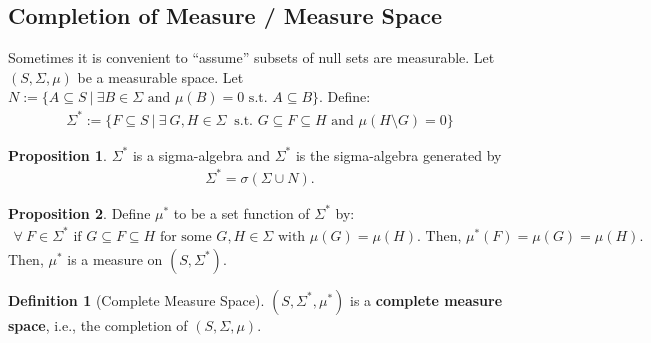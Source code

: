 \documentclass[11pt]{article}
\theoremstyle{definition}
\newtheorem{defn}{Definition}[section]
\newtheorem{prop}{Proposition}[section]
\theoremstyle{theorem}
\begin{document}
\subsection{Completion of Measure / Measure Space}
Sometimes it is convenient to ``assume'' subsets of null sets are measurable. Let \( (S, \Sigma, \mu) \) be a measurable space. Let \( N := \{ A \subseteq S\ |\ \exists B \in \Sigma \text{ and } \mu(B) = 0 \text{ s.t. } A \subseteq B \} \). Define: 
\begin{align}
	\Sigma^* := \{ F \subseteq S\ |\ \exists\ G, H \in \Sigma\ \text{ s.t. } G \subseteq F \subseteq H \text{ and } \mu (H \setminus G ) = 0 \} 
\end{align}
\begin{prop}
	\( \Sigma^* \) is a sigma-algebra and \( \Sigma^* \) is the sigma-algebra generated by 
	\begin{align*}
		\Sigma^* = \sigma ( \Sigma \cup N ).	
	\end{align*}
\end{prop}
\begin{prop}
Define \( \mu^* \) to be a set function of \( \Sigma^* \) by: 
\begin{align*}
	\forall\ F \in \Sigma^* \text{ if } G \subseteq F \subseteq H \text{ for some } G, H \in \Sigma \text{ with } \mu(G) = \mu(H). \text{ Then, }  \mu^*( F) = \mu(G) = \mu(H). 
\end{align*}
	Then, \( \mu^* \) is a measure on \( (S, \Sigma^*) \). 
\end{prop}

\begin{defn}[Complete Measure Space]
	\( (S, \Sigma^*, \mu^*) \) is a \textbf{complete measure space}, i.e., the completion of \( (S, \Sigma, \mu) \).
\end{defn}
\end{document}
